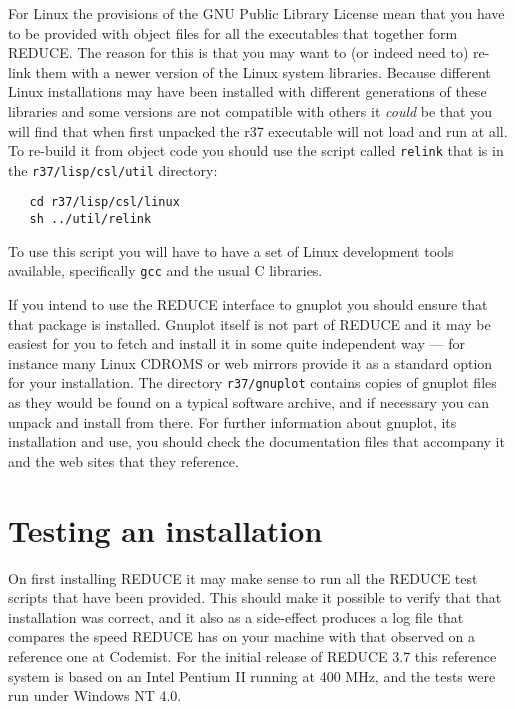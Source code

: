 \documentclass[a4paper,11pt]{article}
\begin{document}
For Linux the provisions of the GNU Public Library License mean that
you have to be provided with object files for all the executables that
together form REDUCE. The reason for this is that you may want to (or
indeed need to) re-link them with a newer version of the Linux system
libraries. Because different Linux installations may have been installed
with different generations of these libraries and some versions are
not compatible with others it {\em could} be that you will find that when
first unpacked the r37 executable will not load and run at all. To
re-build it from object code you should use the script called \verb+relink+
that is in the \verb+r37/lisp/csl/util+ directory:
\begin{verbatim}
   cd r37/lisp/csl/linux
   sh ../util/relink
\end{verbatim}
\noindent To use this script you will have to have a set of Linux development
tools available, specifically \verb.gcc. and the usual C libraries.

If you intend to use the REDUCE interface to {\ttfamily gnuplot} you should
ensure that that package is installed. Gnuplot itself is not part of REDUCE
and it may be easiest for you to fetch and install it in some quite
independent way --- for instance many Linux CDROMS or web mirrors provide it
as a standard option for your installation. The directory \verb+r37/gnuplot+
contains copies of {\ttfamily gnuplot} files as they would be found on
a typical software archive, and if necessary you can unpack and install from
there. For further information about {\ttfamily gnuplot}, its installation and
use, you should check the documentation files that accompany it and the
web sites that they reference.


\section{Testing an installation}
On first installing REDUCE it may make sense to run all the REDUCE test
scripts that have been provided. This should make it possible to verify that
that installation was correct, and it also as a side-effect produces a
log file that compares the speed REDUCE has on your machine with that
observed on a reference one at Codemist. For the initial release of REDUCE 3.7
this reference system is based on an Intel Pentium II running at 400 MHz, and
the tests were run under Windows NT 4.0.
\end{document}
